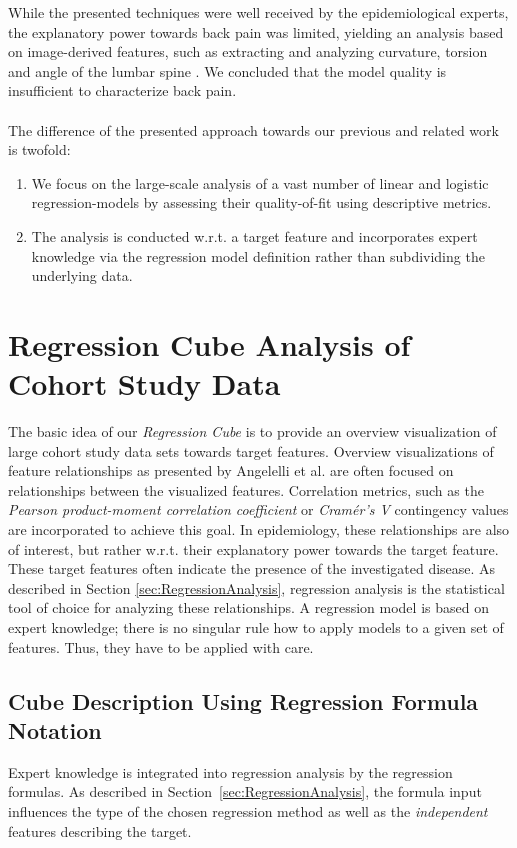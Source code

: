 \documentclass[journal]{style/vgtc} 			          %
\newcommand{\com}[1]{\textcolor{orange}{\uline{#1}}}
\begin{document}
While the presented techniques were well received by the epidemiological experts, the explanatory power towards back pain was limited, yielding an analysis based on image-derived features, such as extracting and analyzing curvature, torsion and angle of the lumbar spine \cite{Klemm2015}.
We concluded that the model quality is insufficient to characterize back pain.
\\\\
The difference of the presented approach towards our previous and related work is twofold:
\begin{enumerate}
	\item We focus on the large-scale analysis of a vast number of linear and logistic regression-models by assessing their quality-of-fit using descriptive metrics.
	\item The analysis is conducted w.r.t. a target feature and incorporates expert knowledge via the regression model definition rather than subdividing the underlying data.
\end{enumerate}
\section{Regression Cube Analysis of Cohort Study Data}
The basic idea of our \emph{Regression Cube} is to provide an overview visualization of large cohort study data sets towards target features.
Overview visualizations of feature relationships as presented by Angelelli et al. \cite{Angelelli} are often focused on relationships between the visualized features.
Correlation metrics, such as the \emph{Pearson product-moment correlation coefficient} or \emph{Cram\'{e}r's V} contingency values are incorporated to achieve this goal.
In epidemiology, these relationships are also of interest, but rather w.r.t. their explanatory power towards the target feature.
These target features often indicate the presence of the investigated disease.
As described in Section \ref{sec:RegressionAnalysis}, regression analysis is the statistical tool of choice for analyzing these relationships.
A regression model is based on expert knowledge; there is no singular rule how to apply models to a given set of features. Thus, they have to be applied with care.
\subsection{Cube Description Using Regression Formula Notation}
Expert knowledge is integrated into regression analysis by the regression formulas.
As described in Section~\ref{sec:RegressionAnalysis}, the formula input influences the type of the chosen regression method as well as the \emph{independent} features describing the target.
\end{document}

